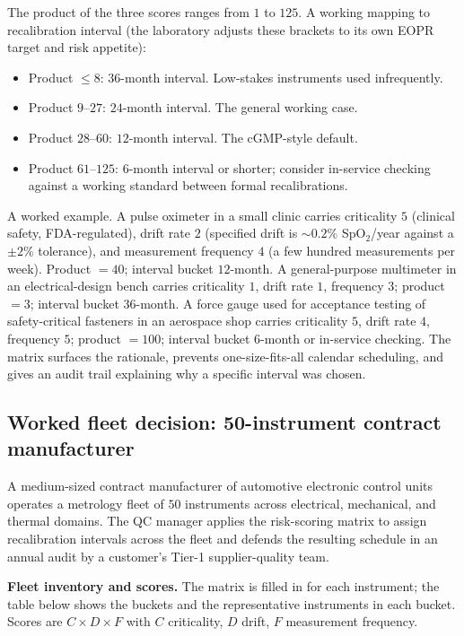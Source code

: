 The product of the three scores ranges from $1$ to $125$. A
working mapping to recalibration interval (the laboratory adjusts
these brackets to its own EOPR target and risk appetite):

\begin{itemize}[leftmargin=*]
  \item Product $\leq 8$: $36$-month interval. Low-stakes
    instruments used infrequently.
  \item Product $9$--$27$: $24$-month interval. The general working
    case.
  \item Product $28$--$60$: $12$-month interval. The cGMP-style
    default.
  \item Product $61$--$125$: $6$-month interval or shorter; consider
    in-service checking against a working standard between formal
    recalibrations.
\end{itemize}

A worked example. A pulse oximeter in a small clinic carries
criticality $5$ (clinical safety, FDA-regulated), drift rate $2$
(specified drift is $\sim 0.2\%$ SpO$_2$/year against a
$\pm 2\%$ tolerance), and measurement frequency $4$ (a few hundred
measurements per week). Product $= 40$; interval bucket $12$-month.
A general-purpose multimeter in an electrical-design bench
carries criticality $1$, drift rate $1$, frequency $3$;
product $= 3$; interval bucket $36$-month. A force gauge used for
acceptance testing of safety-critical fasteners in an aerospace
shop carries criticality $5$, drift rate $4$, frequency $5$;
product $= 100$; interval bucket $6$-month or in-service checking.
The matrix surfaces the rationale, prevents one-size-fits-all
calendar scheduling, and gives an audit trail explaining why a
specific interval was chosen.

\subsection{Worked fleet decision: 50-instrument contract
manufacturer}

A medium-sized contract manufacturer of automotive electronic
control units operates a metrology fleet of $50$ instruments
across electrical, mechanical, and thermal domains. The QC
manager applies the risk-scoring matrix to assign recalibration
intervals across the fleet and defends the resulting schedule in
an annual audit by a customer's Tier-1 supplier-quality team.

\textbf{Fleet inventory and scores.} The matrix is filled in for
each instrument; the table below shows the buckets and the
representative instruments in each bucket. Scores are
$C \times D \times F$ with $C$ criticality, $D$ drift, $F$
measurement frequency.

